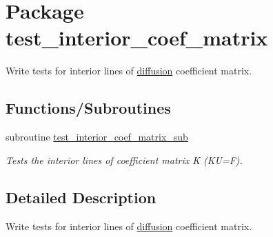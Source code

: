 \hypertarget{a00087}{
\section{Package test\_\-interior\_\-coef\_\-matrix}
\label{a00087}
}
Write tests for interior lines of \hyperlink{a00056}{diffusion} coefficient matrix.  


\subsection*{Functions/Subroutines}
\begin{CompactItemize}
\item 
\hypertarget{a00087_91e5b0249c84beb40803a4f6ca4c5e0a}{
subroutine \hyperlink{a00087_91e5b0249c84beb40803a4f6ca4c5e0a}{test\_\-interior\_\-coef\_\-matrix\_\-sub}}
\label{a00087_91e5b0249c84beb40803a4f6ca4c5e0a}

\begin{CompactList}\small\item\em Tests the interior lines of coefficient matrix K (KU=F). \item\end{CompactList}\end{CompactItemize}


\subsection{Detailed Description}
Write tests for interior lines of \hyperlink{a00056}{diffusion} coefficient matrix. 

